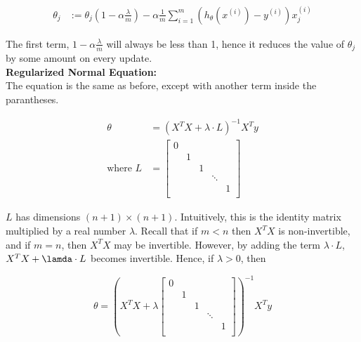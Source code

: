 \documentclass{article}
\begin{document}
        \begin{align*}
            \theta_j    &:= \theta_j\left(1-\alpha\frac{\lambda}{m}\right)-\alpha\frac{1}{m}\sum^m_{i=1}
                        (h_\theta(x^{(i)})-y^{(i)})x_j^{(i)}
        \end{align*}

        \noindent The first term, $1-\alpha\frac{\lambda}{m}$ will always be less than 1, hence it reduces the
        value of $\theta_j$ by some amount on every update. \\

        \noindent \textbf{Regularized Normal Equation:} \\
        The equation is the same as before, except with another term inside the parantheses.

        \begin{align*}
            \theta          &= \left(X^T X+\lambda\cdot L\right)^{-1} X^T y \\
            \text{where } L &= \begin{bmatrix} 0 & & & & \\ & 1 & & & \\ & & 1 & & \\ & & & \ddots & \\
                                & & & & 1 \\ \end{bmatrix}
        \end{align*}

        \pagebreak
        \noindent $L$ has dimensions $(n+1)\times(n+1)$. Intuitively, this is the identity matrix multiplied
        by a real number $\lambda$. Recall that if $m<n$ then $X^T X$ is non-invertible, and if $m=n$, then
        $X^T X$ may be invertible. However, by adding the term $\lambda\cdot L$, $X^T X+\lamda\cdot L$ becomes
        invertible. Hence, if $\lambda>0$, then

        \begin{equation*}
            \theta=\left(X^T X +\lambda
            \begin{bmatrix} 0 & & & & \\ & 1 & & & \\ & & 1 & & \\ & & & \ddots & \\
            & & & & 1 \\ \end{bmatrix}\right)^{-1} X^T y
        \end{equation*}
\end{document}
